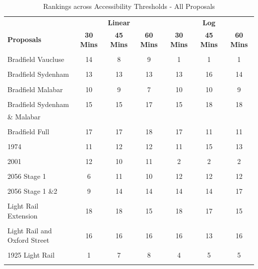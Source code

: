 \documentclass[preprint,12pt,authoryear]{elsarticle}
\begin{document}
\begin{table}[H]
\centering
\footnotesize 
\caption{Rankings across Accessibility Thresholds - All Proposals}\label{robustness1}

\begin{tabular}{p{3cm}ccc|ccc}
    \toprule

    & \multicolumn{3}{c}{\textbf{Linear}}& \multicolumn{3}{c}{\textbf{Log}}\\
 \textbf{Proposals}& \textbf{30 Mins }& \textbf{45 Mins}& \textbf{60 Mins}& \textbf{30 Mins}& \textbf{45 Mins}&\textbf{60 Mins}\\
    \midrule
 & & & & & & \\
 Bradfield Vaucluse& 14& 8& 9& 1& 1& 1\\
 & & 
& 
& 
& 

&
\\
 Bradfield Sydenham& 13& 13& 13& 13& 16& 14\\
 & & 
& 
& 
& 

&
\\
 Bradfield Malabar& 10& 9& 7& 10& 10&9\\
 & & 
& 
& 
& 

&
\\
 Bradfield Sydenham & 15& 15& 17& 15& 18&18\\
 \& Malabar& & 
& 
& 
& 

&
\\
 & & 
& 
& 
& 

&
\\
 Bradfield Full& 17& 17& 18& 17& 11&11\\
 & & 
& 
& 
& 

&
\\
 1974 & 11& 12& 12& 11& 15&13\\
 & & 
& 
& 
& 

&

\\
 2001 & 12& 10& 11& 2& 2&2\\
 & & & & & 
&
\\
 2056 Stage 1 
& 6& 11& 10& 12& 12&12\\
 & & & & & &\\
 2056 Stage 1 \&2 
& 9& 14& 14& 14& 14&17\\
 & & & & & &\\
 Light Rail Extension& 18& 18& 15& 18& 17&15\\
 & & & & & &\\
 Light Rail and Oxford Street& 16& 16& 16& 16& 13&16\\
 & & & & & &\\
 1925 Light Rail& 1& 7& 8& 4& 5&5\\
 & & & & & &\\
 \bottomrule
\end{tabular}
\end{table}
\end{document}
